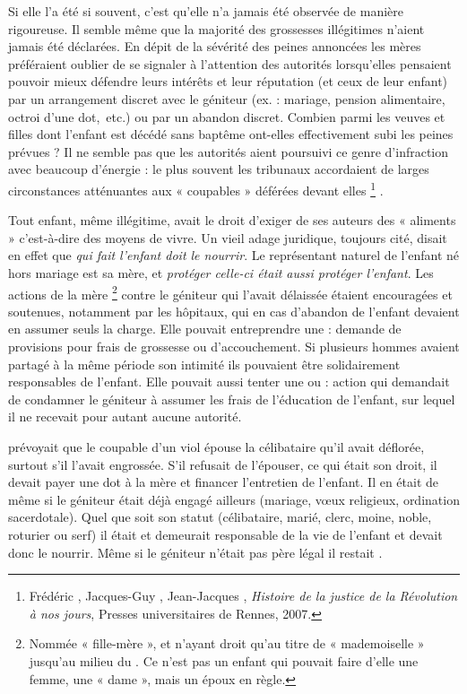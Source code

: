 Si elle l'a été si souvent, c'est qu'elle n'a jamais été observée de manière rigoureuse. Il semble même que la majorité des grossesses illégitimes n'aient jamais été déclarées. En dépit de la sévérité des peines annoncées les mères préféraient oublier de se signaler à l'attention des autorités lorsqu'elles pensaient pouvoir mieux défendre leurs intérêts et leur réputation (et ceux de leur enfant) par un arrangement discret avec le géniteur (ex. : mariage, pension alimentaire, octroi d'une dot,~etc.) ou par un abandon discret. Combien parmi les veuves et filles dont l'enfant est décédé sans baptême ont-elles effectivement subi les peines prévues ? Il ne semble pas que les autorités aient poursuivi ce genre d'infraction avec beaucoup d'énergie : le plus souvent les tribunaux accordaient de larges circonstances atténuantes aux « coupables » déférées devant elles%
\footnote{Frédéric , Jacques-Guy , Jean-Jacques , \emph{Histoire de la justice de la Révolution à nos jours}, Presses universitaires de Rennes, 2007.}%
. 

 Tout enfant, même illégitime, avait le droit d'exiger de ses auteurs des « aliments » c'est-à-dire des moyens de vivre. Un vieil adage juridique, toujours cité, disait en effet que \emph{qui fait l'enfant doit le nourrir}. Le représentant naturel de l'enfant né hors mariage est sa mère, et \emph{protéger celle-ci était aussi protéger l'enfant}. Les actions de la mère%
\footnote{Nommée « fille-mère », et n'ayant droit qu'au titre de « mademoiselle » jusqu'au milieu du . Ce n'est pas un enfant qui pouvait faire d'elle une femme, une « dame », mais un époux en règle.} 
contre le géniteur qui l'avait délaissée étaient encouragées et soutenues, notamment par les hôpitaux, qui en cas d'abandon de l'enfant devaient en assumer seuls la charge. Elle pouvait entreprendre une  : demande de provisions pour frais de grossesse ou d'accouchement. Si plusieurs hommes avaient partagé à la même période son intimité ils pouvaient être solidairement responsables de l'enfant. Elle pouvait aussi tenter une  ou  : action qui demandait de condamner le géniteur à assumer les frais de l'éducation de l'enfant, sur lequel il ne recevait pour autant aucune autorité. 

  prévoyait que le coupable d'un viol épouse la célibataire qu'il avait déflorée, surtout s'il l'avait engrossée. S'il refusait de l'épouser, ce qui était son droit, il devait payer une dot à la mère et financer l'entretien de l'enfant. Il en était de même si le géniteur était déjà engagé ailleurs (mariage, vœux religieux, ordination sacerdotale). Quel que soit son statut (célibataire, marié, clerc, moine, noble, roturier ou serf) il était et demeurait responsable de la vie de l'enfant et devait donc le nourrir. Même si le géniteur n'était pas père légal il restait .

